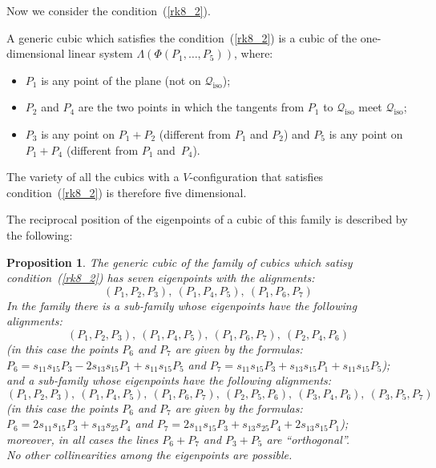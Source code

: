 \documentclass{amsart}
\theoremstyle{plain}
\newtheorem{prop}[lemma]{Proposition}
\theoremstyle{definition}
\newcommand{\iso}{\mathcal{Q}_{\mathrm{iso}}}
\begin{document}
Now we consider the condition~(\ref{rk8_2}).

%
A generic cubic which satisfies the condition~(\ref{rk8_2}) is
a cubic of the one-dimensional linear system
$\Lambda(\Phi(P_1, \dotsc, P_5))$, where:
\begin{itemize}
\item $P_1$ is any point of the plane (not on $\iso$);
\item $P_2$ and $P_4$ are the two points in which the
tangents from $P_1$ to $\iso$ meet $\iso$;
\item $P_3$ is any point on  $P_1+P_2$ (different from $P_1$ and $P_2$)
and $P_5$ is any point on $P_1+P_4$ (different from $P_1$ and~$P_4$).
\end{itemize}

The variety of all the cubics with a $V$-configuration
that
satisfies condition~(\ref{rk8_2}) is therefore five dimensional.

The reciprocal position of the eigenpoints of a cubic of this family
is described by the following:
%
\begin{prop}
\label{prop:rk8_2B}
The generic cubic of the family of cubics which satisy condition~(\ref{rk8_2})
has seven eigenpoints with the alignments:
\[
(P_1, P_2, P_3), \ (P_1, P_4, P_5), \ (P_1, P_6, P_7)
\]
In the family there is a sub-family whose eigenpoints have the following
alignments:
\[
(P_1, P_2, P_3),\  (P_1, P_4, P_5),\  (P_1, P_6, P_7),\  (P_2, P_4, P_6)
\]
(in this case the points $P_6$ and $P_7$ are given by the formulas:
$P_6 = s_{11}s_{15}P_3-2s_{13}s_{15}P_1+s_{11}s_{15}P_5$ and
$P_7 = s_{11}s_{15}P_3+s_{13}s_{15}P_1+s_{11}s_{15}P_5$);\\
and a sub-family whose eigenpoints have the following
alignments:
\[
(P_1, P_2, P_3),\  (P_1, P_4, P_5), \ (P_1, P_6, P_7),\  (P_2, P_5, P_6),\
(P_3, P_4, P_6),\  (P_3, P_5, P_7)
\]
(in this case the points $P_6$ and $P_7$ are given by the formulas:
$P_6 = 2s_{11}s_{15}P_3+s_{13}s_{25}P_4$ and
$P_7 = 2s_{11}s_{15}P_3+s_{13}s_{25}P_4+2s_{13}s_{15}P_1$);\\
moreover, in all cases the lines $P_6+P_7$ and $P_3+P_5$ are ``orthogonal''.\\
No other collinearities among the eigenpoints are possible.
\end{prop}
\end{document}
